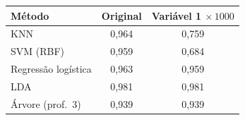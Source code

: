 \begin{tabular}{@{}lcc@{}}
\toprule
Método & Original & Variável 1 $\times\,1000$ \\
\midrule
KNN & 0,964 & 0,759 \\
SVM (RBF) & 0,959 & 0,684 \\
Regressão logística & 0,963 & 0,959 \\
LDA & 0,981 & 0,981 \\
Árvore (prof.\ 3) & 0,939 & 0,939 \\
\bottomrule
\end{tabular}
